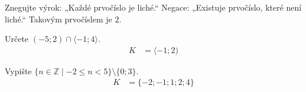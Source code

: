 \documentclass[11pt,a4paper]{article}
\begin{document}
\begin{zadaniReseniBox}[title={Samostatná práce 1}]
Znegujte výrok: „Každé prvočíslo je liché.“
\tcblower
Negace: „Existuje prvočíslo, které není liché.“ Takovým prvočíslem je $2$.
\end{zadaniReseniBox}
\begin{zadaniReseniBox}[title={Samostatná práce 2}]
Určete $(-5;2)\cap\langle-1;4\rangle$.
\tcblower
\[
\begin{aligned}
K&=\langle-1;2)
\end{aligned}
\]

\end{zadaniReseniBox}
\begin{zadaniReseniBox}[title={Samostatná práce 3}]
Vypište $\{n\in\mathbb Z\mid -2\le n<5\}\setminus\{0;3\}$.
\tcblower
\[
\begin{aligned}
K&=\{-2;-1;1;2;4\}
\end{aligned}
\]

\end{zadaniReseniBox}
\end{document}
